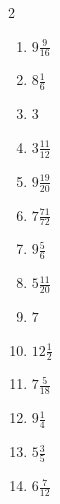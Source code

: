 \documentclass[12pt]{article}
\begin{document}
\begin{multicols}{2}
\begin{enumerate}
\item $ 9 \frac{9}{16} $
\item $ 8 \frac{1}{6} $
\item $ 3 $
\item $ 3 \frac{11}{12} $
\item $ 9 \frac{19}{20} $
\item $ 7 \frac{71}{72} $
\item $ 9 \frac{5}{6} $
\item $ 5 \frac{11}{20} $
\item $ 7 $
\item $ 12 \frac{1}{2} $
\item $ 7 \frac{5}{18} $
\item $ 9 \frac{1}{4} $
\item $ 5 \frac{3}{5} $
\item $ 6 \frac{7}{12} $
\end{enumerate}\end{multicols}\newpage
\end{document}
